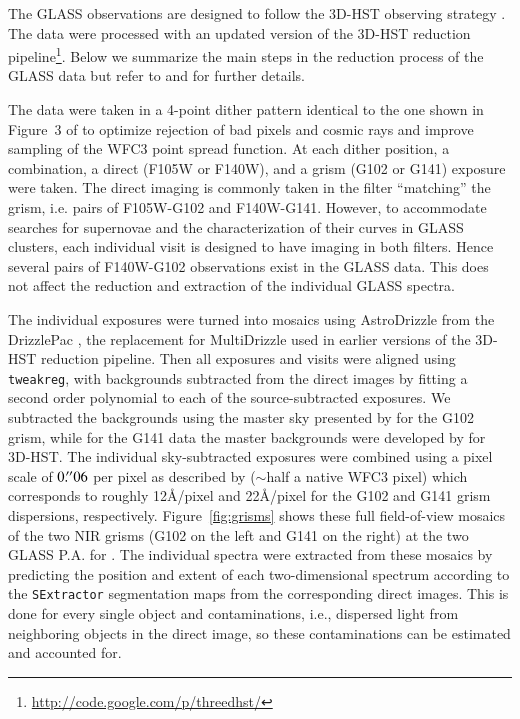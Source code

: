 
The GLASS observations are designed to follow the 3D-HST observing strategy \citep{Brammer:2012p12977}.
The data were processed with an updated version of the 3D-HST reduction pipeline\footnote{\url{http://code.google.com/p/threedhst/}}.  Below we summarize the main steps in the reduction process of the GLASS data but refer to 
\citet{Brammer:2012p12977} and \citet{Treu:2015p36793} for further details.

The data were taken in a 4-point dither pattern identical to the one
shown in Figure~3 of \cite{Brammer:2012p12977} to optimize rejection of bad pixels and cosmic rays
and improve sampling of the WFC3 point spread function.
At each dither position, a combination, a direct (F105W or F140W), and a grism (G102 or G141) exposure were taken.
The direct imaging is commonly taken in the filter ``matching'' the grism, i.e. pairs of F105W-G102 and F140W-G141.  However, to 
accommodate searches for supernovae and the characterization of their curves in GLASS clusters, each individual visit is designed 
to have imaging in both filters. Hence several pairs of F140W-G102 observations exist in the GLASS data. This does not affect the 
reduction and extraction of the individual GLASS spectra.

The individual exposures were turned into mosaics using AstroDrizzle from the DrizzlePac \citep{Gonzaga:2014p26307}, the  
replacement for MultiDrizzle \citep{Koekemoer:2003p31861} used in earlier versions of the 3D-HST reduction pipeline. Then all  
exposures and visits were aligned using \verb+tweakreg+, with backgrounds subtracted from the direct images by fitting a second  
order polynomial to each of the source-subtracted exposures. We subtracted the backgrounds using the master sky presented by  
\cite{Kummel:2011p33451} for the G102 grism, while for the G141 data the master backgrounds were developed by  
\cite{Brammer:2012p12977} for 3D-HST. The individual sky-subtracted exposures were combined using a pixel scale of $0\mbox{$.\!^{\prime\prime}$}06$ per  
pixel as described by \citet{Brammer:2013p27911} ($\sim$half a native WFC3 pixel) which corresponds to roughly 12\AA/pixel and  
22\AA/pixel for the G102 and G141 grism dispersions, respectively. Figure~\ref{fig:grisms} shows these full field-of-view 
mosaics of the two NIR grisms (G102 on the left and G141 on the right) at the two GLASS P.A. for \cler. The  individual spectra 
were extracted from these mosaics by predicting the position and extent of each two-dimensional spectrum according to the 
\verb+SExtractor+ \citep{Bertin:1996p12964} segmentation maps from the corresponding direct images. This is done for every single 
object and contaminations, i.e., dispersed light from neighboring objects in the direct image, so these contaminations can be 
estimated and accounted for.

